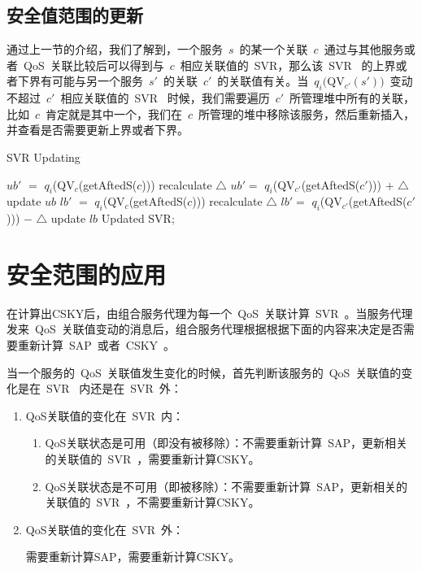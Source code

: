 \subsection{安全值范围的更新}

通过上一节的介绍，我们了解到，一个服务~$s$~的某一个关联~$c$~通过与其他服务或者~QoS~关联比较后可以得到与~$c$~相应关联值的~SVR，那么该~SVR~ 的上界或者下界有可能与另一个服务~$s'$~的关联~$c'$~的关联值有关。当~$q_{i}($QV$_{c'}(s'))$~变动不超过~$c'$~相应关联值的~SVR~ 时候，我们需要遍历~$c'$~所管理堆中所有的关联，比如~$c$~肯定就是其中一个，我们在~$c$~所管理的堆中移除该服务，然后重新插入，并查看是否需要更新上界或者下界。

\begin{algorithm}[htbp]
\caption{SVR Updating}
\label{A:Algo_SVR_Updating}
    {
        {
            {
                $ub'$ $=$ $q_{i}$(QV$_{c}$(getAftedS($c$)))\;
            }
            \Else
            {
                recalculate $\triangle$\;
                $ub' =$ $q_{i}$(QV$_{c'}$(getAftedS($c'$))) $+$ $\triangle$\;
            }
            update $ub$\;
        }
        \Else
        {
            {
                $lb'$ $=$ $q_{i}$(QV$_{c}$(getAftedS($c$)))\;
            }
            \Else
            {
                recalculate $\triangle$\;
                $lb' =$ $q_{i}$(QV$_{c'}$(getAftedS($c'$))) $-$ $\triangle$\;
            }
            update $lb$\;
        }
    }
    {
    \Return Updated SVR;
    }
\end{algorithm}

\section{安全范围的应用}

在计算出CSKY后，由组合服务代理为每一个~QoS~关联计算~SVR~。当服务代理发来~QoS~关联值变动的消息后，组合服务代理根据根据下面的内容来决定是否需要重新计算~SAP~或者~CSKY~。

当一个服务的~QoS~关联值发生变化的时候，首先判断该服务的~QoS~关联值的变化是在~SVR~ 内还是在~SVR~外：
\begin{enumerate}
  \item QoS关联值的变化在~SVR~内：

      \begin{enumerate}
            \item QoS关联状态是可用（即没有被移除）：不需要重新计算~SAP，更新相关的关联值的~SVR~，需要重新计算CSKY。
            \item QoS关联状态是不可用（即被移除）：不需要重新计算~SAP，更新相关的关联值的~SVR~，不需要重新计算CSKY。
      \end{enumerate}

  \item QoS关联值的变化在~SVR~外：

    需要重新计算SAP，需要重新计算CSKY。
\end{enumerate}

